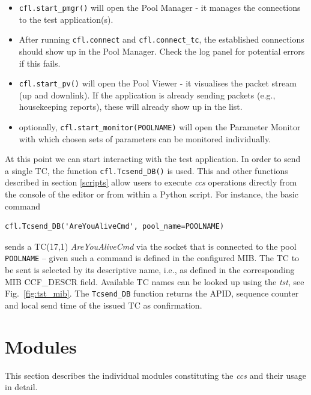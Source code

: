 \begin{itemize}
\item \texttt{cfl.start\_pmgr()} will open the Pool Manager - it manages the connections to the test application(s).

\item After running \texttt{cfl.connect} and \texttt{cfl.connect\_tc}, the established connections should show up in the Pool Manager. Check the log panel for potential errors if this fails.

\item \texttt{\texttt{cfl.start\_pv()}} will open the Pool Viewer - it visualises the packet stream (up and downlink).
If the application is already sending packets (e.g., housekeeping reports), these will already show up in the list.

\item optionally, \texttt{cfl.start\_monitor(POOLNAME)} will open the Parameter Monitor with which chosen sets of parameters can be monitored individually.
\end{itemize}

At this point we can start interacting with the test application.
In order to send a single TC, the function \texttt{cfl.Tcsend\_DB()} is used. This and other functions described in section \ref{scripts}
allow users to execute \textit{ccs} operations directly from the console of the editor or from within a Python script.
For instance, the basic command

\begin{verbatim}
cfl.Tcsend_DB('AreYouAliveCmd', pool_name=POOLNAME)
\end{verbatim}

sends a TC(17,1) \emph{AreYouAliveCmd} via the socket that is connected to the pool \texttt{POOLNAME} -- given such a command
is defined in the configured MIB. The TC to be sent is selected by its descriptive name, i.e., as defined in the corresponding
MIB CCF\_DESCR field. Available TC names can be looked up using the \textit{tst}, see Fig.~\ref{fig:tst_mib}.
The \texttt{Tcsend\_DB} function returns the APID, sequence counter and local send time of the issued TC as confirmation.




\section{Modules}
This section describes the individual modules constituting the \textit{ccs} and their usage in detail.

